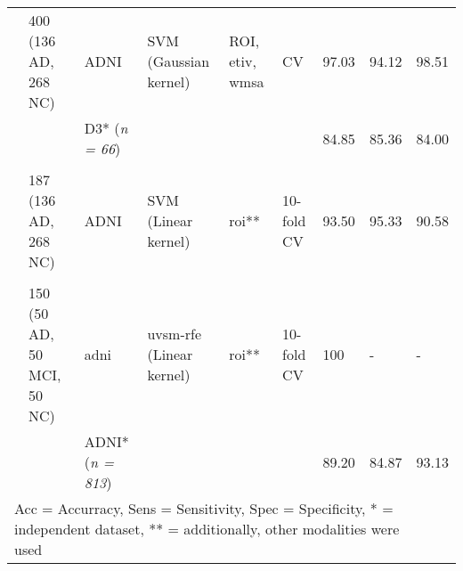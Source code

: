 \begin{table}[H]
{\begin{tabular}{lllllllll}
         
          
    \multicolumn{1}{l}{\cite{liPredictionClinicalBiomarker2020}} & 400 (136 AD, 268 NC) & \multicolumn{1}{l}{ADNI} & SVM (Gaussian kernel) & ROI, \gls{etiv}, \gls{wmsa} & CV & 97.03 & 94.12 & 98.51 \\
    
          &  & \multicolumn{1}{l}{D3* (\textit{n = 66})} &  &  &  & 84.85 & 85.36 & 84.00\\

          \\
          
    \multicolumn{1}{l}{\cite{khatriEfficientCombinationSMRI2020a}} & 187 (136 AD, 268 NC) & \multicolumn{1}{l}{ADNI} & SVM (Linear kernel) & \gls{roi}** & 10-fold CV & 93.50 & 95.33 & 90.58  \\
\\

  \multicolumn{1}{l}{\cite{richhariyaDiagnosisAlzheimerDisease2020}} & 150 (50 AD, 50 MCI, 50 NC) & \multicolumn{1}{l}{\gls{adni}} & \multicolumn{1}{l}{\gls{uvsm-rfe} (Linear kernel)} & \gls{roi}** & 10-fold CV   & 100     & -     & - \\
   
   &  & \multicolumn{1}{l}{ADNI* (\textit{n = 813})} &  &  &  & 89.20 & 84.87 & 93.13\\
    \hline \hline
    
    \multicolumn{8}{l}{Acc = Accurracy, Sens = Sensitivity, Spec = Specificity, * = independent dataset, ** = additionally, other modalities were used}
    \end{tabular} }
  
\end{table}%




